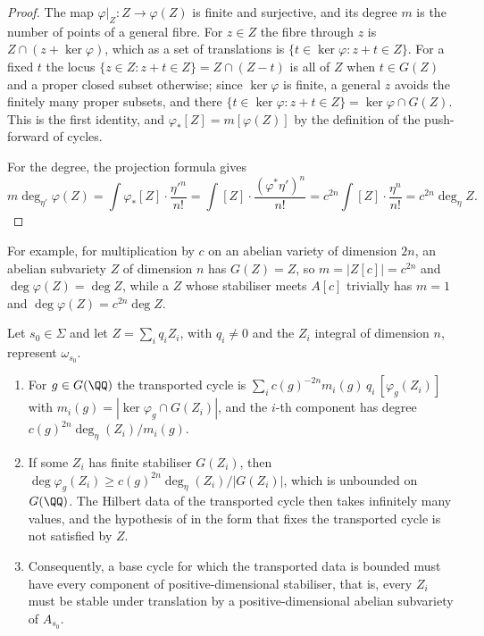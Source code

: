 \begin{proof}
The map $\varphi|_{Z}\colon Z\to\varphi(Z)$ is finite and surjective, and its
degree $m$ is the number of points of a general fibre. For $z\in Z$ the fibre
through $z$ is $Z\cap(z+\ker\varphi)$, which as a set of translations is
$\{t\in\ker\varphi:z+t\in Z\}$. For a fixed $t$ the locus
$\{z\in Z:z+t\in Z\}=Z\cap(Z-t)$ is all of $Z$ when $t\in G(Z)$ and a proper
closed subset otherwise; since $\ker\varphi$ is finite, a general $z$ avoids
the finitely many proper subsets, and there
$\{t\in\ker\varphi:z+t\in Z\}=\ker\varphi\cap G(Z)$. This is the first
identity, and $\varphi_{*}[Z]=m[\varphi(Z)]$ by the definition of the
push-forward of cycles.

For the degree, the projection formula gives
\[
  m\deg_{\eta'}\varphi(Z)=\int\varphi_{*}[Z]\cdot\frac{\eta'^{n}}{n!}
  =\int[Z]\cdot\frac{(\varphi^{*}\eta')^{n}}{n!}
  =c^{2n}\int[Z]\cdot\frac{\eta^{n}}{n!}=c^{2n}\deg_{\eta}Z .
\]
\end{proof}

For example, for multiplication by $c$ on an abelian variety of dimension $2n$,
an abelian subvariety $Z$ of dimension $n$ has $G(Z)=Z$, so $m=|Z[c]|=c^{2n}$
and $\deg\varphi(Z)=\deg Z$, while a $Z$ whose stabiliser meets $A[c]$
trivially has $m=1$ and $\deg\varphi(Z)=c^{2n}\deg Z$.

\begin{theorem}\label{thm:p1forces}
Let $s_{0}\in\Sigma$ and let $Z=\sum_{i}q_{i}Z_{i}$, with $q_{i}\ne0$ and the
$Z_{i}$ integral of dimension $n$, represent $\omega_{s_{0}}$.
\begin{enumerate}[label=\textup{(\roman*)},leftmargin=2.6em,itemsep=2pt]
\item For $g\in G(\QQ)$ the transported cycle is
  $\sum_{i}c(g)^{-2n}m_{i}(g)\,q_{i}\,[\varphi_{g}(Z_{i})]$ with
  $m_{i}(g)=|\ker\varphi_{g}\cap G(Z_{i})|$, and the $i$-th component has
  degree $c(g)^{2n}\deg_{\eta}(Z_{i})/m_{i}(g)$.
\item If some $Z_{i}$ has finite stabiliser $G(Z_{i})$, then
  $\deg\varphi_{g}(Z_{i})\ge c(g)^{2n}\deg_{\eta}(Z_{i})/|G(Z_{i})|$, which is
  unbounded on $G(\QQ)$. The Hilbert data of the transported cycle then takes
  infinitely many values, and the hypothesis of  in the
  form that fixes the transported cycle is not satisfied by $Z$.
\item Consequently, a base cycle for which the transported data is bounded
  must have every component of positive-dimensional stabiliser, that is, every
  $Z_{i}$ must be stable under translation by a positive-dimensional abelian
  subvariety of $A_{s_{0}}$.
\end{enumerate}
\end{theorem}

